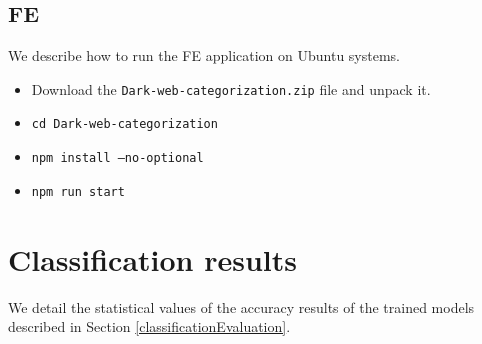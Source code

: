 \begin{appendices}
\section{FE}
We describe how to run the FE application on Ubuntu systems.
\begin{itemize}
    \item Download the \texttt{Dark-web-categorization.zip} file and unpack it.
    \item \texttt{cd Dark-web-categorization}
    \item \texttt{npm install --no-optional}
    \item \texttt{npm run start}
\end{itemize}
\end{appendices}





\chapter{Classification results}
We detail the statistical values of the accuracy results of the trained models described in Section \ref{classificationEvaluation}.


